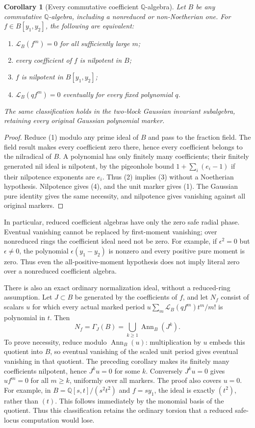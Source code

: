 \documentclass[11pt]{article}
\newtheorem{corollary}[theorem]{Corollary}
\newcommand{\Q}{\mathbb Q}
\newcommand{\Lfac}{\mathcal L}
\begin{document}
\begin{corollary}[Every commutative coefficient $\Q$-algebra]
Let $B$ be any commutative $\Q$-algebra, including a nonreduced or
non-Noetherian one. For $f\in B[y_1,y_2]$, the following are equivalent:
\begin{enumerate}
\item $\Lfac_B(f^m)=0$ for all sufficiently large $m$;
\item every coefficient of $f$ is nilpotent in $B$;
\item $f$ is nilpotent in $B[y_1,y_2]$;
\item $\Lfac_B(qf^m)=0$ eventually for every fixed polynomial $q$.
\end{enumerate}
The same classification holds in the two-block Gaussian invariant
subalgebra, retaining every original Gaussian polynomial marker.
\end{corollary}
\begin{proof}
Reduce (1) modulo any prime ideal of $B$ and pass to the fraction field.
The field result makes every coefficient zero there, hence every coefficient
belongs to the nilradical of $B$. A polynomial has only finitely many
coefficients; their finitely generated nil ideal is nilpotent, by the
pigeonhole bound $1+\sum_i(e_i-1)$ if their nilpotence exponents are $e_i$.
Thus (2) implies (3) without a Noetherian hypothesis. Nilpotence gives (4),
and the unit marker gives (1). The Gaussian pure identity gives the same
necessity, and nilpotence gives vanishing against all original markers.
\end{proof}
In particular, reduced coefficient algebras have only the zero safe radial
phase. Eventual vanishing cannot be replaced by first-moment vanishing;
over nonreduced rings the coefficient ideal need not be zero.
For example, if $\epsilon^2=0$ but $\epsilon\ne0$, the polynomial
$\epsilon(y_1-y_2)$ is nonzero and every positive pure moment is zero.
Thus even the all-positive-moment hypothesis does not imply literal zero
over a nonreduced coefficient algebra.

There is also an exact ordinary normalization ideal, without a reduced-ring
assumption. Let $J\subset B$ be generated by the coefficients of $f$, and
let $N_f$ consist of scalars $u$ for which every actual marked period
$u\sum_m\Lfac_B(qf^m)t^m/m!$ is polynomial in $t$. Then
\[
 N_f=\Gamma_J(B)=\bigcup_{k\ge1}\operatorname{Ann}_B(J^k).    \tag{17}
\]
To prove necessity, reduce modulo $\operatorname{Ann}_B(u)$: multiplication
by $u$ embeds this quotient into $B$, so eventual vanishing of the scaled
unit period gives eventual vanishing in that quotient. The preceding
corollary makes its finitely many coefficients nilpotent, hence $J^k u=0$
for some $k$. Conversely $J^k u=0$ gives $uf^m=0$ for all $m\ge k$,
uniformly over all markers. The proof also covers $u=0$.
For example, in $B=\Q[s,t]/(s^2t^2)$ and $f=sy_1$, the ideal is exactly
$(t^2)$, rather than $(t)$. This follows immediately by the monomial basis
of the quotient. Thus this classification retains the ordinary torsion
that a reduced safe-locus computation would lose.
\end{document}
